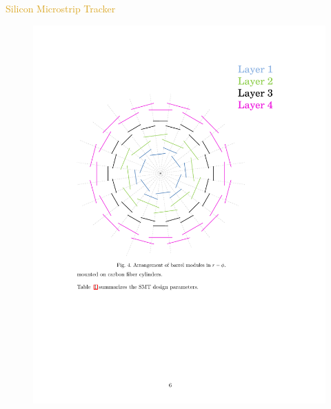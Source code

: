 \begin{frame}{\textcolor{Goldenrod}{Silicon Microstrip Tracker}}
  \begin{overlayarea}{\textwidth}{\textheight}
    \begin{figure}[h]
      \centering
      \includegraphics[height=0.6\textheight]{./Images/09_SMT_01}

\end{figure}
\end{overlayarea}
\end{frame}
